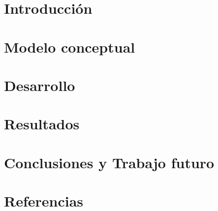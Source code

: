 \documentclass[11pt, a4paper]{article}
\begin{document}

\maketitle
\newpage

\tableofcontents
\newpage

%
\section{Introducción}


\section{Modelo conceptual}


\section{Desarrollo}


\section{Resultados}


\section{Conclusiones y Trabajo futuro}


\section{Referencias}



%
% 
%
\end{document}
